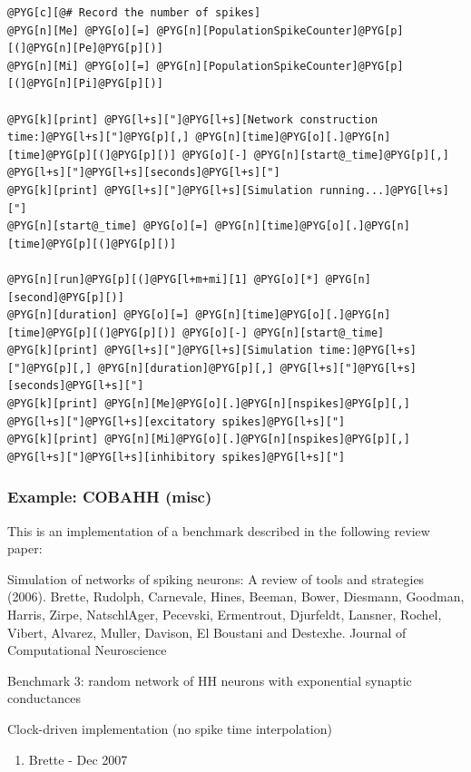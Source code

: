 \documentclass[letterpaper,10pt,english]{manual}
\begin{document}
\begin{Verbatim}[commandchars=@\[\]]
@PYG[c][@# Record the number of spikes]
@PYG[n][Me] @PYG[o][=] @PYG[n][PopulationSpikeCounter]@PYG[p][(]@PYG[n][Pe]@PYG[p][)]
@PYG[n][Mi] @PYG[o][=] @PYG[n][PopulationSpikeCounter]@PYG[p][(]@PYG[n][Pi]@PYG[p][)]

@PYG[k][print] @PYG[l+s]["]@PYG[l+s][Network construction time:]@PYG[l+s]["]@PYG[p][,] @PYG[n][time]@PYG[o][.]@PYG[n][time]@PYG[p][(]@PYG[p][)] @PYG[o][-] @PYG[n][start@_time]@PYG[p][,] @PYG[l+s]["]@PYG[l+s][seconds]@PYG[l+s]["]
@PYG[k][print] @PYG[l+s]["]@PYG[l+s][Simulation running...]@PYG[l+s]["]
@PYG[n][start@_time] @PYG[o][=] @PYG[n][time]@PYG[o][.]@PYG[n][time]@PYG[p][(]@PYG[p][)]

@PYG[n][run]@PYG[p][(]@PYG[l+m+mi][1] @PYG[o][*] @PYG[n][second]@PYG[p][)]
@PYG[n][duration] @PYG[o][=] @PYG[n][time]@PYG[o][.]@PYG[n][time]@PYG[p][(]@PYG[p][)] @PYG[o][-] @PYG[n][start@_time]
@PYG[k][print] @PYG[l+s]["]@PYG[l+s][Simulation time:]@PYG[l+s]["]@PYG[p][,] @PYG[n][duration]@PYG[p][,] @PYG[l+s]["]@PYG[l+s][seconds]@PYG[l+s]["]
@PYG[k][print] @PYG[n][Me]@PYG[o][.]@PYG[n][nspikes]@PYG[p][,] @PYG[l+s]["]@PYG[l+s][excitatory spikes]@PYG[l+s]["]
@PYG[k][print] @PYG[n][Mi]@PYG[o][.]@PYG[n][nspikes]@PYG[p][,] @PYG[l+s]["]@PYG[l+s][inhibitory spikes]@PYG[l+s]["]
\end{Verbatim}

\resetcurrentobjects
\hypertarget{--doc-examples-misc_COBAHH}{}

\hypertarget{index-36}{}\subsubsection{Example: COBAHH (misc)}

This is an implementation of a benchmark described
in the following review paper:

Simulation of networks of spiking neurons: A review of tools and strategies (2006).
Brette, Rudolph, Carnevale, Hines, Beeman, Bower, Diesmann, Goodman, Harris, Zirpe,
NatschlAger, Pecevski, Ermentrout, Djurfeldt, Lansner, Rochel, Vibert, Alvarez, Muller,
Davison, El Boustani and Destexhe.
Journal of Computational Neuroscience

Benchmark 3: random network of HH neurons with exponential synaptic conductances

Clock-driven implementation
(no spike time interpolation)
\begin{enumerate}
\item {} 
Brette - Dec 2007

\end{enumerate}
\end{document}
